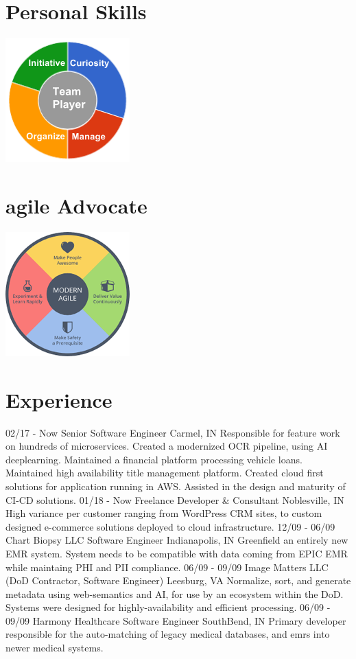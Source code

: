 \documentclass[]{friggeri-cv}
\begin{document}
\begin{aside}
  \section{Personal Skills}
    \includegraphics[scale=0.62]{img/personal.png}
    ~
 \section{agile Advocate}
 \includegraphics[scale=0.62]{img/agile.png}
\end{aside}

\section{Experience}
\begin{entrylist}
  \entry
    {02/17 - Now}
    {Senior Software Engineer}
    {Carmel, IN}
    {Responsible for feature work on hundreds of microservices. Created a modernized OCR pipeline, using AI deeplearning. Maintained a financial platform processing vehicle loans. Maintained high availability title management platform. Created cloud first solutions for application running in AWS. Assisted in the design and maturity of CI-CD solutions.  }
  \entry
    {01/18 - Now}
    {Freelance Developer \& Consultant}
    {Noblesville, IN}
    {High variance per customer ranging from WordPress CRM sites, to custom designed e-commerce solutions deployed to cloud infrastructure. }
    \entry
    {12/09 - 06/09}
    {Chart Biopsy LLC Software Engineer}
    {Indianapolis, IN}
    {Greenfield an entirely new EMR system. System needs to be compatible with data coming from EPIC EMR while maintaing PHI and PII compliance. }
    \entry
    {06/09 - 09/09}
    {Image Matters LLC (DoD Contractor, Software Engineer)}
    {Leesburg, VA}
    {Normalize, sort, and generate metadata using web-semantics and AI, for use by an ecosystem within the DoD. Systems were designed for highly-availability and efficient processing. }
    \entry
    {06/09 - 09/09}
    {Harmony Healthcare Software Engineer}
    {SouthBend, IN}
    {Primary developer responsible for the auto-matching of legacy medical databases, and emrs into newer medical systems. }
\end{entrylist}
\end{document}
